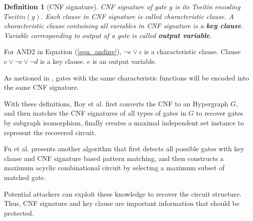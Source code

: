 \documentclass[conference]{IEEEtran}
\newtheorem{definition}{\textbf{Definition}}
\begin{document}
\begin{definition}[CNF signature]
CNF signature of gate $g$ is its Tseitin encoding $Tseitin(g)$.
Each clause in CNF signature is called characteristic clause.
A characteristic clause containing all variables in CNF signature is a \textbf{key clause}.
Variable corresponding to output of a gate is called \textbf{output variable}.
\end{definition}

For AND2 in Equation (\ref{eqn_andinv}), 
$\neg e\vee c$ is a characteristic clause.
Clause $e\vee \neg c\vee\neg d$ is a key clause.
$e$ is an output variable.

As metioned in \cite{csRoy}, 
gates with the same characteristic functions will be encoded into the same CNF signature.

% 
With these definitions, 
Roy et al. \cite{csRoy}
first converts the CNF to an Hypergraph $G$, 
and then matches the CNF signatures of all types of gates in $G$ to recover gates by subgraph isomorphism, 
finally creates a maximal independent set instance to represent the recovered circuit.

Fu et al.\cite{csFu} presents another algorithm that
first detects all possible gates with key clause and CNF signature based pattern matching, 
and then constructs a maximum acyclic combinational circuit by selecting a maximum subset of matched gate.

Potential attackers can exploit these knowledge to recover the circuit structure.
Thus, CNF signature and key clause are important information that should be protected.
\end{document}
